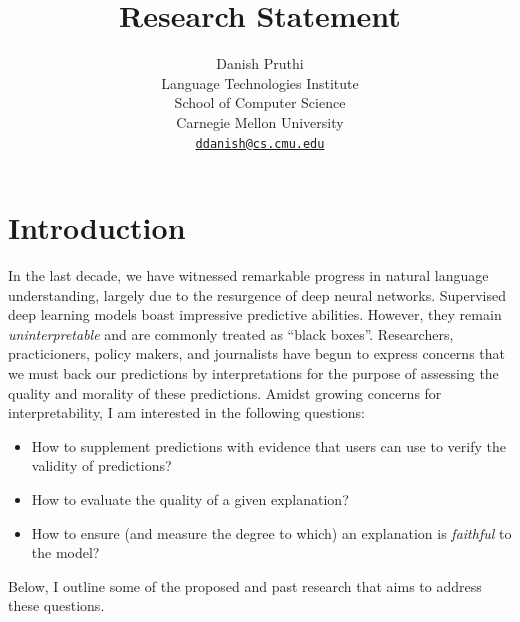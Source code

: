 \documentclass{article}
\title{
Research Statement}
\author{Danish Pruthi\\
Language Technologies Institute\\
School of Computer Science\\
Carnegie Mellon University\\
\href{mailto:ddanish@cs.cmu.edu}{\nolinkurl{ddanish@cs.cmu.edu}}
}
\date{}
\begin{document}
\maketitle

\section{Introduction}

In the last decade, we have witnessed 
remarkable progress in natural language understanding,  
largely due to the resurgence of deep neural networks.
Supervised deep learning models 
boast impressive predictive abilities.
However, they remain \emph{uninterpretable} and are commonly treated as 
``black boxes''. 
Researchers, practicioners, policy makers, and journalists have begun to express concerns that 
we must back our predictions by interpretations for the purpose of assessing the 
quality and morality of these predictions. 
Amidst growing concerns for interpretability, 
I am interested in the following questions:
\begin{itemize}
    \item How to supplement predictions with evidence that users can use to verify the validity of predictions? 
    \item How to evaluate the quality of a given explanation? 
    \item How to ensure (and measure the degree to which) an explanation is \emph{faithful} to the model? %
\end{itemize}
Below, I outline some of the proposed and past research that aims to address these questions.
\end{document}
